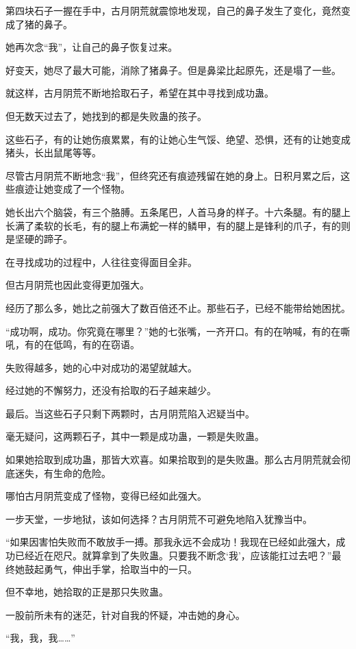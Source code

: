\begin{this_body}
第四块石子一握在手中，古月阴荒就震惊地发现，自己的鼻子发生了变化，竟然变成了猪的鼻子。

她再次念“我”，让自己的鼻子恢复过来。

好变天，她尽了最大可能，消除了猪鼻子。但是鼻梁比起原先，还是塌了一些。

就这样，古月阴荒不断地拾取石子，希望在其中寻找到成功蛊。

但无数天过去了，她找到的都是失败蛊的孩子。

这些石子，有的让她伤痕累累，有的让她心生气馁、绝望、恐惧，还有的让她变成猪头，长出鼠尾等等。

尽管古月阴荒不断地念“我”，但终究还有痕迹残留在她的身上。日积月累之后，这些痕迹让她变成了一个怪物。

她长出六个脑袋，有三个胳膊。五条尾巴，人首马身的样子。十六条腿。有的腿上长满了柔软的长毛，有的腿上布满蛇一样的鳞甲，有的腿上是锋利的爪子，有的则是坚硬的蹄子。

在寻找成功的过程中，人往往变得面目全非。

但古月阴荒也因此变得更加强大。

经历了那么多，她比之前强大了数百倍还不止。那些石子，已经不能带给她困扰。

“成功啊，成功。你究竟在哪里？”她的七张嘴，一齐开口。有的在呐喊，有的在嘶吼，有的在低鸣，有的在窃语。

失败得越多，她的心中对成功的渴望就越大。

经过她的不懈努力，还没有拾取的石子越来越少。

最后。当这些石子只剩下两颗时，古月阴荒陷入迟疑当中。

毫无疑问，这两颗石子，其中一颗是成功蛊，一颗是失败蛊。

如果她拾取到成功蛊，那皆大欢喜。如果拾取到的是失败蛊。那么古月阴荒就会彻底迷失，有生命的危险。

哪怕古月阴荒变成了怪物，变得已经如此强大。

一步天堂，一步地狱，该如何选择？古月阴荒不可避免地陷入犹豫当中。

“如果因害怕失败而不敢放手一搏。那我永远不会成功！我现在已经如此强大，成功已经近在咫尺。就算拿到了失败蛊。只要我不断念‘我’，应该能扛过去吧？”最终她鼓起勇气，伸出手掌，拾取当中的一只。

但不幸地，她拾取的正是那只失败蛊。

一股前所未有的迷茫，针对自我的怀疑，冲击她的身心。

“我，我，我……”


\end{this_body}
